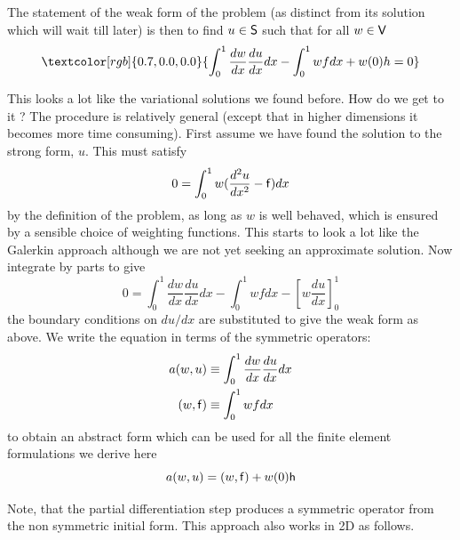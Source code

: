 \documentclass[10pt]{article}
\newcommand{\curly}{\sf }
\newcommand{\Red     }[1]{\textcolor[rgb]{0.7,0.0,0.0}{#1}}
\begin{document}
	The statement of the weak form of the problem (as distinct from
	its solution which will wait till later) is then to find $u \in {\curly S}$ such 
	that for all $w \in {\curly V}$
		\begin{equation}
			\Red{ \int_0^1 \frac{d w }{d x} \frac{d u}{d x} dx - \int_0^1 w f dx + w(0) h = 0 }
		\end{equation}
	
	This looks a lot like the variational solutions we found before. How do we get to it ?
	The procedure is relatively general (except that in higher dimensions it becomes more 
	time consuming). First assume we have found the solution to the strong form, $u$. This must
	satisfy
		\begin{equation}
			0 = \int_0^1 w( \frac{d^2 u}{d x^2} - {\curly f} )dx
		\end{equation}
	by the definition of the problem, as long as $w$ is well behaved, which 
	is ensured by a sensible choice of weighting functions. This starts to look
	a lot like the Galerkin approach although we are not yet seeking an approximate
	solution. Now integrate by parts to give 
		\begin{equation}
			0 = \int_0^1 \frac{d w }{d x} \frac{d u}{d x} dx - \int_0^1 w f dx - \left[ w \frac{d u}{d x} \right]_0^1
		\end{equation}
	the boundary conditions on $du / dx$ are substituted to give the weak form as above.
	We write the equation in terms of the symmetric operators:
		\begin{equation}
			\begin{split}
			a(w,u) & \equiv 	\int_0^1 \frac{d w }{d x} \frac{d u}{d x} dx \\
			(w,{\curly f})  & \equiv  \int_0^1 w f dx
			\end{split}
		\end{equation}
	to obtain an abstract form which can be used for all the finite element
	formulations we derive here
		\begin{equation}
			a(w,u) = (w,{\curly f})  + w(0){\curly h}
			\label{eq:FEabst}
		\end{equation}
	
	
	Note, that the partial differentiation step produces a symmetric operator from the
	non symmetric initial form. This approach also works in 2D as follows.	
	
\end{document}
